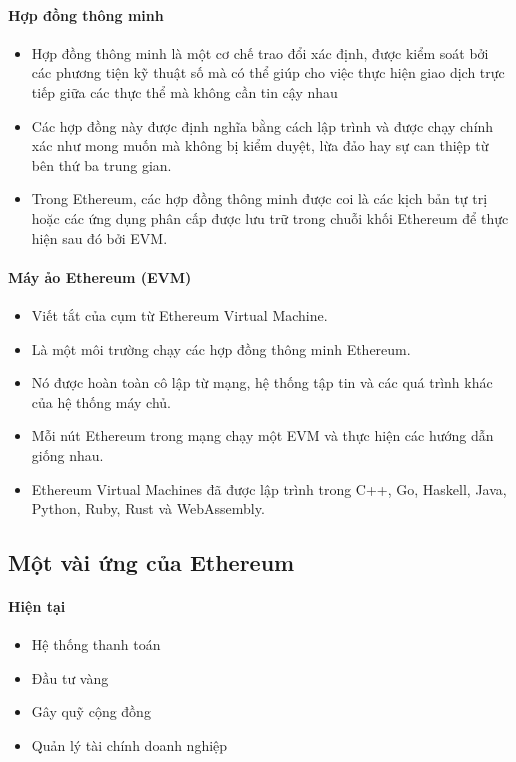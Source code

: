 \documentclass[12pt]{article}
\begin{document}
		\paragraph{Hợp đồng thông minh}
		\begin{itemize}
			\item Hợp đồng thông minh là một cơ chế trao đổi xác định, được kiểm soát bởi các phương tiện kỹ thuật số mà có thể giúp cho việc thực hiện giao dịch trực tiếp giữa các thực thể mà không cần tin cậy nhau
			\item Các hợp đồng này được định nghĩa bằng cách lập trình và được chạy chính xác như mong muốn mà không bị kiểm duyệt, lừa đảo hay sự can thiệp từ bên thứ ba trung gian.
			\item Trong Ethereum, các hợp đồng thông minh được coi là các kịch bản tự trị hoặc các ứng dụng phân cấp được lưu trữ trong chuỗi khối Ethereum để thực hiện sau đó bởi EVM.
			
		\end{itemize}
		\paragraph{Máy ảo Ethereum (EVM)}
		\begin{itemize}
			\item Viết tắt của cụm từ Ethereum Virtual Machine. 
			\item Là một môi trường chạy các hợp đồng thông minh Ethereum.
			\item Nó được hoàn toàn cô lập từ mạng, hệ thống tập tin và các quá trình khác của hệ thống máy chủ.
			\item Mỗi nút Ethereum trong mạng chạy một EVM và thực hiện các hướng dẫn giống nhau.
			\item Ethereum Virtual Machines đã được lập trình trong C++, Go, Haskell, Java, Python, Ruby, Rust và WebAssembly.
			
		\end{itemize}
		\subsection{Một vài ứng của Ethereum}
		\paragraph{Hiện tại}
		\begin{itemize}
			\item Hệ thống thanh toán
			\item Đầu tư vàng
			\item Gây quỹ cộng đồng
			\item Quản lý tài chính doanh nghiệp
			
		\end{itemize}
\end{document}

